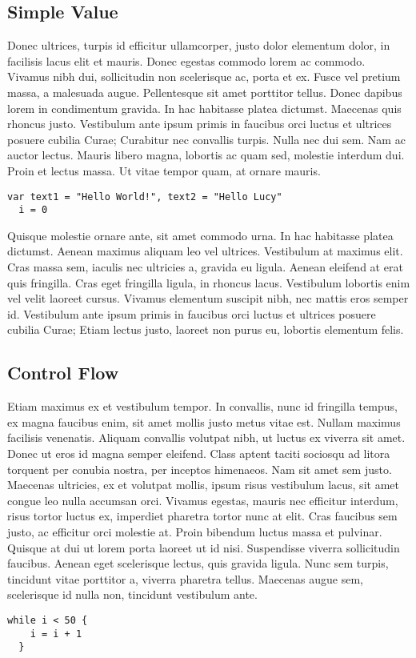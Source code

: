 \subsection{Simple Value}
Donec ultrices, turpis id efficitur ullamcorper, justo dolor elementum dolor, in facilisis lacus elit et mauris. Donec egestas commodo lorem ac commodo. Vivamus nibh dui, sollicitudin non scelerisque ac, porta et ex. Fusce vel pretium massa, a malesuada augue. Pellentesque sit amet porttitor tellus. Donec dapibus lorem in condimentum gravida. In hac habitasse platea dictumst. Maecenas quis rhoncus justo. Vestibulum ante ipsum primis in faucibus orci luctus et ultrices posuere cubilia Curae; Curabitur nec convallis turpis. Nulla nec dui sem. Nam ac auctor lectus. Mauris libero magna, lobortis ac quam sed, molestie interdum dui. Proin et lectus massa. Ut vitae tempor quam, at ornare mauris.
\begin{lstlisting}[language=Lucy]
  var text1 = "Hello World!", text2 = "Hello Lucy"
  i = 0
\end{lstlisting}
Quisque molestie ornare ante, sit amet commodo urna. In hac habitasse platea dictumst. Aenean maximus aliquam leo vel ultrices. Vestibulum at maximus elit. Cras massa sem, iaculis nec ultricies a, gravida eu ligula. Aenean eleifend at erat quis fringilla. Cras eget fringilla ligula, in rhoncus lacus. Vestibulum lobortis enim vel velit laoreet cursus. Vivamus elementum suscipit nibh, nec mattis eros semper id. Vestibulum ante ipsum primis in faucibus orci luctus et ultrices posuere cubilia Curae; Etiam lectus justo, laoreet non purus eu, lobortis elementum felis.

\subsection{Control Flow}
Etiam maximus ex et vestibulum tempor. In convallis, nunc id fringilla tempus, ex magna faucibus enim, sit amet mollis justo metus vitae est. Nullam maximus facilisis venenatis. Aliquam convallis volutpat nibh, ut luctus ex viverra sit amet. Donec ut eros id magna semper eleifend. Class aptent taciti sociosqu ad litora torquent per conubia nostra, per inceptos himenaeos. Nam sit amet sem justo. Maecenas ultricies, ex et volutpat mollis, ipsum risus vestibulum lacus, sit amet congue leo nulla accumsan orci. Vivamus egestas, mauris nec efficitur interdum, risus tortor luctus ex, imperdiet pharetra tortor nunc at elit. Cras faucibus sem justo, ac efficitur orci molestie at. Proin bibendum luctus massa et pulvinar. Quisque at dui ut lorem porta laoreet ut id nisi. Suspendisse viverra sollicitudin faucibus. Aenean eget scelerisque lectus, quis gravida ligula. Nunc sem turpis, tincidunt vitae porttitor a, viverra pharetra tellus. Maecenas augue sem, scelerisque id nulla non, tincidunt vestibulum ante.
\begin{lstlisting}[language=Lucy]
  while i < 50 {
    i = i + 1
  }
\end{lstlisting}

